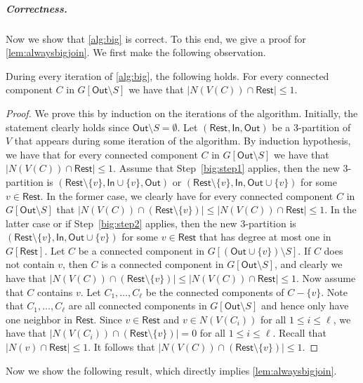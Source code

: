 \documentclass[a4paper,UKenglish,cleveref, autoref, thm-restate, numberwithinsect]{lipics-v2021}
\newcounter{algorithm}
\newcommand{\In}{\mathsf{In}}
\newcommand{\Out}{\mathsf{Out}}
\newcommand{\Rest}{\mathsf{Rest}}
\begin{document}
\subparagraph{Correctness.}
Now we show that \cref{alg:big} is correct. To this end, we give a proof for \cref{lem:alwaysbigjoin}.
We first make the following observation.



\begin{lemma}\label{lem:oneneighborbig}
During every iteration of \cref{alg:big}, the following holds. For every connected component $C$ in $G[\Out\setminus S]$ we have that $|N(V(C))\cap \Rest|\le 1$.
\end{lemma}
\begin{proof}
We prove this by induction on the iterations of the algorithm. Initially, the statement clearly holds since $\Out\setminus S=\emptyset$. Let $(\Rest,\In,\Out)$ be a 3-partition of $V$ that appears during some iteration of the algorithm. By induction hypothesis, we have that for every connected component $C$ in $G[\Out\setminus S]$ we have that $|N(V(C))\cap \Rest|\le 1$.
Assume that Step~\ref{big:step1} applies, then the new 3-partition is $(\Rest\setminus \{v\},\In\cup\{v\},\Out)$ or $(\Rest\setminus \{v\},\In,\Out\cup\{v\})$ for some $v\in \Rest$. In the former case, we clearly have for every connected component $C$ in $G[\Out\setminus S]$ that $|N(V(C))\cap (\Rest\setminus\{v\})|\le |N(V(C))\cap \Rest|\le 1$.
In the latter case or if Step~\ref{big:step2} applies, then the new 3-partition is $(\Rest\setminus \{v\},\In,\Out\cup\{v\})$ for some $v\in \Rest$ that has degree at most one in $G[\Rest]$. Let $C$ be a connected component in $G[(\Out\cup\{v\})\setminus S]$. If $C$ does not contain $v$, then $C$ is a connected component in $G[\Out\setminus S]$, and clearly we have that $|N(V(C))\cap (\Rest\setminus\{v\})|\le |N(V(C))\cap \Rest|\le 1$. Now assume that $C$ contains $v$. Let $C_1,\ldots,C_\ell$ be the connected components of $C-\{v\}$. Note that $C_1,\ldots,C_\ell$ are all connected components in $G[\Out\setminus S]$ and hence only have one neighbor in $\Rest$. Since $v\in\Rest$ and $v\in N(V(C_i))$ for all $1\le i\le \ell$, we have that $|N(V(C_i))\cap (\Rest\setminus\{v\})|=0$ for all $1\le i\le \ell$. Recall that $|N(v)\cap\Rest|\le 1$. It follows that $|N(V(C))\cap (\Rest\setminus\{v\})|\le 1$. 
\end{proof}

Now we show the following result, which directly implies \cref{lem:alwaysbigjoin}.
\end{document}
